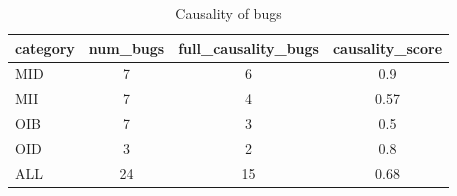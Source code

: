 \begin{table}[ht]
\centering
\renewcommand{\arraystretch}{1.06}
\setlength{\tabcolsep}{4pt}
\begin{tabular}{|l||c|c|c|}
\hline
{\sc category} & {\sc num\_bugs} & {\sc full\_causality\_bugs} & {\sc causality\_score} \\
\toprule
\hline
MID & 7 & 6 & 0.9 \\
\hline
MII & 7 & 4 & 0.57 \\
\hline
OIB & 7 & 3 & 0.5 \\
\hline
OID & 3 & 2 & 0.8 \\
\hline
ALL & 24 & 15 & 0.68 \\
\hline
\end{tabular}
\caption{Causality of bugs}
\end{table}
